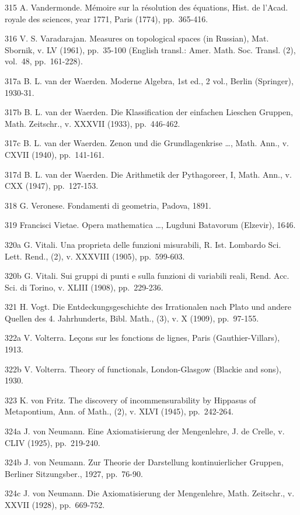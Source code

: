 315 A. Vandermonde. Mémoire sur la résolution des équations, Hist. de l'Acad. royale des sciences, year 1771, Paris (1774), pp.~365-416.

316 V. S. Varadarajan. Measures on topological spaces (in Russian), Mat. Sbornik, v. LV (1961), pp.~35-100 (English transl.: Amer. Math. Soc. Transl. (2), vol.~48, pp.~161-228).

317a B. L. van der Waerden. Moderne Algebra, 1st ed., 2 vol., Berlin (Springer), 1930-31.

317b B. L. van der Waerden. Die Klassification der einfachen Lieschen Gruppen, Math. Zeitschr., v. XXXVII (1933), pp.~446-462.

317c B. L. van der Waerden. Zenon und die Grundlagenkrise \ldots, Math. Ann., v. CXVII (1940), pp.~141-161.

317d B. L. van der Waerden. Die Arithmetik der Pythagoreer, I, Math. Ann., v. CXX (1947), pp.~127-153.

318 G. Veronese. Fondamenti di geometria, Padova, 1891.

319 Francisci Vietae. Opera mathematica \ldots, Lugduni Batavorum (Elzevir), 1646.

320a G. Vitali. Una proprieta delle funzioni misurabili, R. Ist. Lombardo Sci. Lett. Rend., (2), v. XXXVIII (1905), pp.~599-603.

320b G. Vitali. Sui gruppi di punti e sulla funzioni di variabili reali, Rend. Acc. Sci. di Torino, v. XLIII (1908), pp.~229-236.

321 H. Vogt. Die Entdeckungsgeschichte des Irrationalen nach Plato und andere Quellen des 4. Jahrhunderts, Bibl. Math., (3), v. X (1909), pp.~97-155.

322a V. Volterra. Leçons sur les fonctions de lignes, Paris (Gauthier-Villars), 1913.

322b V. Volterra. Theory of functionals, London-Glasgow (Blackie and sons), 1930.

323 K. von Fritz. The discovery of incommensurability by Hippasus of Metapontium, Ann. of Math., (2), v. XLVI (1945), pp.~242-264.

324a J. von Neumann. Eine Axiomatisierung der Mengenlehre, J. de Crelle, v. CLIV (1925), pp.~219-240.

324b J. von Neumann. Zur Theorie der Darstellung kontinuierlicher Gruppen, Berliner Sitzungsber., 1927, pp.~76-90.

324c J. von Neumann. Die Axiomatisierung der Mengenlehre, Math. Zeitschr., v. XXVII (1928), pp.~669-752.

